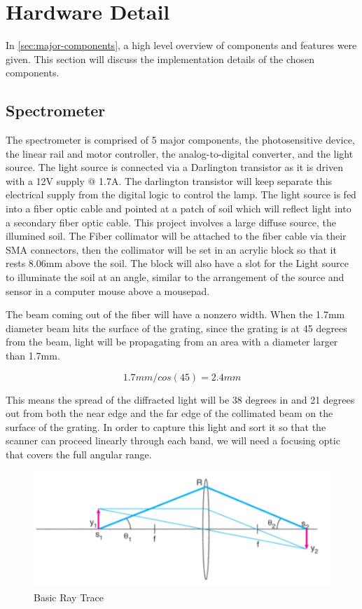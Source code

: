 \documentclass[journal]{IEEEtran}
\begin{document}
\section{Hardware Detail}
In \autoref{sec:major-components}, a high level overview of components and features were given. This
section will discuss the implementation details of the chosen components.
\subsection{Spectrometer}
The spectrometer is comprised of 5 major components, the photosensitive device, the linear rail and motor controller, the analog-to-digital converter, and the light source. The light source is connected via a Darlington transistor as it is driven with a 12V supply @ 1.7A. The darlington transistor will keep separate this electrical supply from the digital logic to control the lamp. The light source is fed into a fiber optic cable and pointed at a patch of soil which will reflect light into a secondary fiber optic cable.
This project involves a large diffuse source, the illumined soil. The Fiber collimator will be attached to the fiber cable via their SMA connectors, then the collimator will be set in an acrylic block so that it rests 8.06mm above the soil. The block will also have a slot for the Light source to illuminate the soil at an angle, similar to the arrangement of the source and sensor in a computer mouse above a mousepad.

The beam coming out of the fiber will have a nonzero width. When the 1.7mm diameter beam hits the surface of the grating, since the grating is at 45 degrees from the beam, light will be propagating from an area with a diameter larger than 1.7mm.

\begin{equation}
    1.7mm/cos(45) = 2.4mm
\end{equation}

This means the spread of the diffracted light will be 38 degrees in and 21 degrees out from both the near edge and the far edge of the collimated beam on the surface of the grating. In order to capture this light and sort it so that the scanner can proceed linearly through each band, we will need a focusing optic that covers the full angular range.

\begin{figure}[H]
    \caption{Basic Ray Trace}
    \centering
    \includegraphics[width=0.75\linewidth]{images/BasicRayTrace.png}
\end{figure}
\end{document}
